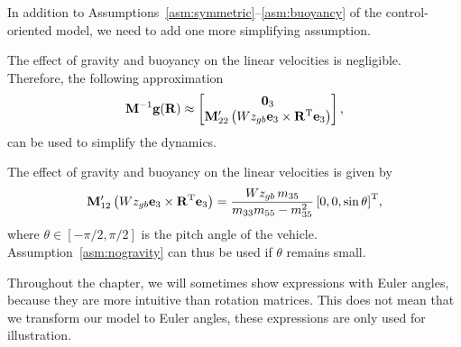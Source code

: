 In addition to Assumptions~\ref{asm:symmetric}--\ref{asm:buoyancy} of the control-oriented model, we need to add one more simplifying assumption.
\begin{asm}
    \label{asm:nogravity}
    The effect of gravity and buoyancy on the linear velocities is negligible.
    Therefore, the following approximation
    \begin{equation}
        \mathbf{M}^{-1}\mathbf{g}(\mathbf{R}) \approx \begin{bmatrix}
            \mathbf{0}_3 \\ \mathbf{M}_{22}^{\prime} \left(Wz_{gb} \mathbf{e}_3 \times \mathbf{R}^{\mathrm{T}} \mathbf{e}_3\right)
        \end{bmatrix},
    \end{equation}
    can be used to simplify the dynamics.
\end{asm}
\begin{rmk*}
The effect of gravity and buoyancy on the linear velocities is given by
\begin{equation}
    \mathbf{M}_{12}^{\prime} \left(Wz_{gb} \mathbf{e}_3 \times \mathbf{R}^{\mathrm{T}} \mathbf{e}_3\right) = \frac{Wz_{gb}\,m_{35}}{m_{33}m_{55} - m_{35}^2}\left[0, 0, \sin\theta\right]^{\mathrm{T}}\!,
\end{equation}
where $\theta \in [-\pi/2, \pi/2]$ is the pitch angle of the vehicle.
Assumption~\ref{asm:nogravity} can thus be used if $\theta$ remains small.
\end{rmk*}
\begin{rmk*}
    Throughout the chapter, we will sometimes show expressions with Euler angles, because they are more intuitive than rotation matrices.
    This does not mean that we transform our model to Euler angles, these expressions are only used for illustration.
\end{rmk*}

